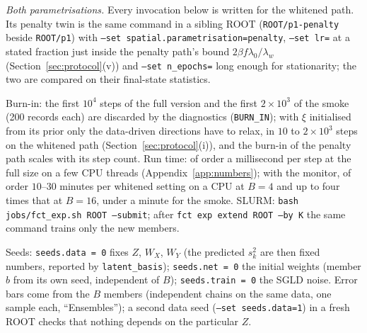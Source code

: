 \documentclass[11pt,a4paper]{article}
\newcommand{\code}[1]{\texttt{#1}}
\begin{document}
\emph{Both parametrisations.} Every invocation below is written for the whitened path. Its penalty twin is the same command in a sibling ROOT (\code{ROOT/p1-penalty} beside \code{ROOT/p1}) with \code{--set spatial.parametrisation=penalty}, \code{--set lr=} at a stated fraction just inside the penalty path's bound $2\beta f\lambda_0/\lambda_w$ (Section~\ref{sec:protocol}(v)) and \code{--set n\_epochs=} long enough for stationarity; the two are compared on their final-state statistics.

Burn-in: the first $10^4$ steps of the full version and the first $2\times10^3$ of the smoke (200 records each) are discarded by the diagnostics (\code{BURN\_IN}); with $\xi$ initialised from its prior only the data-driven directions have to relax, in $10$ to $2\times10^3$ steps on the whitened path (Section~\ref{sec:protocol}(i)), and the burn-in of the penalty path scales with its step count. Run time: of order a millisecond per step at the full size on a few CPU threads (Appendix~\ref{app:numbers}); with the monitor, of order $10$--$30$ minutes per whitened setting on a CPU at $B = 4$ and up to four times that at $B = 16$, under a minute for the smoke. SLURM: \code{bash jobs/fct\_exp.sh ROOT --submit}; after \code{fct exp extend ROOT --by K} the same command trains only the new members.

Seeds: \code{seeds.data = 0} fixes $Z$, $W_X$, $W_Y$ (the predicted $s_k^2$ are then fixed numbers, reported by \code{latent\_basis}); \code{seeds.net = 0} the initial weights (member $b$ from its own seed, independent of $B$); \code{seeds.train = 0} the SGLD noise. Error bars come from the $B$ members (independent chains on the same data, one sample each,  ``Ensembles''); a second data seed (\code{--set seeds.data=1}) in a fresh ROOT checks that nothing depends on the particular $Z$.
\end{document}

